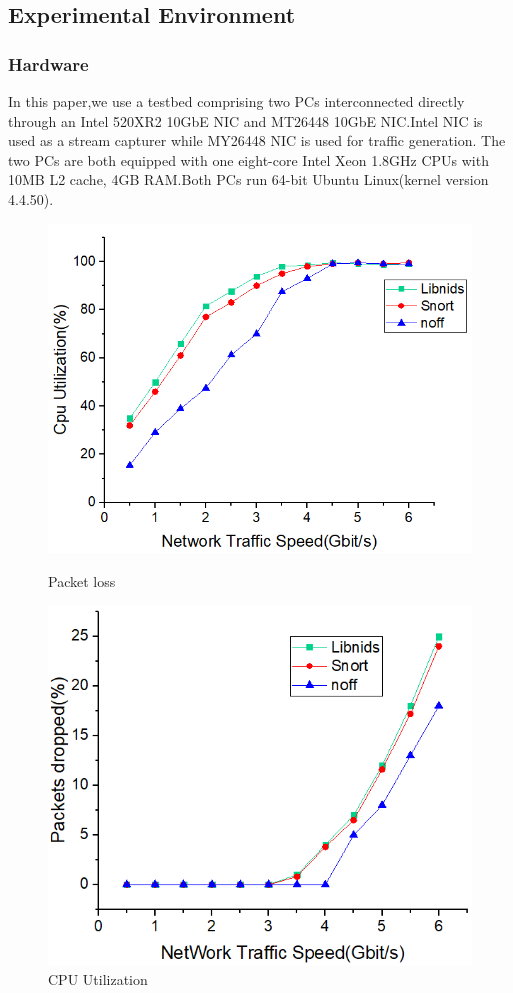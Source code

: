 \documentclass[conference]{IEEEtran}
\begin{document}
\subsection{Experimental Environment}

\subsubsection{Hardware}
In this paper,we use a testbed comprising two PCs interconnected directly through an Intel 520XR2 10GbE NIC and MT26448 10GbE NIC.Intel NIC is used as a stream capturer while MY26448 NIC is used for traffic generation. The two PCs are both equipped with one eight-core Intel Xeon 1.8GHz CPUs with 10MB L2 cache, 4GB RAM.Both PCs run 64-bit Ubuntu Linux(kernel version 4.4.50).
\begin{figure}
\begin{minipage}[t]{0.495\linewidth}
\flushleft
\includegraphics[width=\textwidth]{./picture/Figure6.jpg}
\caption{Packet loss} 
\label{fig:7}
\end{minipage}
\begin{minipage}[t]{0.495\linewidth}
\flushright
\includegraphics[width=\textwidth]{./picture/Figure7.jpg}
\caption{CPU Utilization}
\label{fig:8}
\end{minipage}
\end{figure} 
\end{document}
